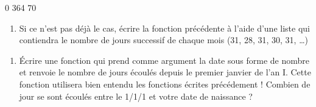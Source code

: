 \documentclass[letterpaper,10pt,english]{sphinxhowto}
\begin{document}
\begin{sphinxVerbatim}[commandchars=\\\{\}]
0
364
70
\end{sphinxVerbatim}
\begin{enumerate}
%
\setcounter{enumi}{3}
\item {} 
\sphinxAtStartPar
Si ce n’est pas déjà le cas, écrire la fonction précédente à l’aide d’une liste qui contiendra le nombre de jours successif de chaque mois (31, 28, 31, 30, 31, …)

\end{enumerate}

\begin{sphinxVerbatim}[commandchars=\\\{\}]
  \PYG{p}{[}           \PYG{p}{]}
  \PYG{p}{[}           \PYG{p}{]}
\end{sphinxVerbatim}
\begin{enumerate}
%
\setcounter{enumi}{4}
\item {} 
\sphinxAtStartPar
Écrire une fonction qui prend comme argument la date sous forme de nombre et renvoie le nombre de jours écoulés depuis le premier janvier de l’an I. Cette fonction utilisera bien entendu les fonctions écrites précédement ! Combien de jour se sont écoulés entre le 1/1/1 et votre date de naissance ?

\end{enumerate}

\begin{sphinxVerbatim}[commandchars=\\\{\}]
  
  
\end{sphinxVerbatim}
\end{document}
